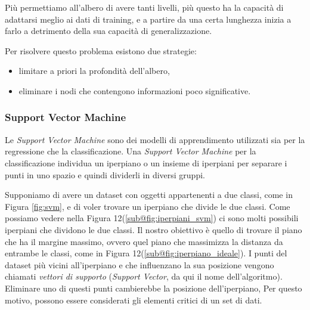 \documentclass[a4paper,12pt]{report}
\begin{document}
Più permettiamo all’albero di avere tanti livelli, più questo ha la capacità di adattarsi meglio ai dati di training, e a partire da una certa lunghezza inizia a farlo a detrimento della sua capacità di generalizzazione. 

Per risolvere questo problema esistono due strategie:
\begin{itemize}
    \item limitare a priori la profondità dell'albero, 
    \item eliminare i nodi che contengono informazioni poco significative.
\end{itemize}


\subsubsection{Support Vector Machine}
Le \textit{Support Vector Machine} sono dei modelli di apprendimento utilizzati sia per la regressione che la classificazione.
Una \textit{Support Vector Machine} \cite{SVM} per la classificazione individua un iperpiano o un insieme di iperpiani per separare i punti in uno spazio e quindi dividerli in diversi gruppi.

Supponiamo di avere un dataset con oggetti appartenenti a due classi, come in Figura \ref{fig:svm}, e di voler trovare un iperpiano che divide le due classi. Come possiamo vedere nella Figura 12(\ref{sub@fig:iperpiani_svm}) ci sono molti possibili iperpiani che dividono le due classi. Il nostro obiettivo è quello di trovare il piano che ha il margine massimo, ovvero quel piano che massimizza la distanza da entrambe le classi, come in Figura 12(\ref{sub@fig:iperpiano_ideale}). I punti del dataset più vicini all'iperpiano e che influenzano la sua posizione vengono chiamati \textit{vettori di supporto} (\textit{Support Vector}, da qui il nome dell'algoritmo). Eliminare uno di questi punti cambierebbe la posizione dell'iperpiano, Per questo motivo, possono essere considerati gli elementi critici di un set di dati.
\end{document}
